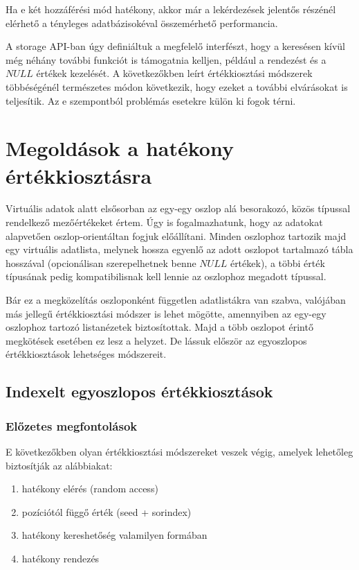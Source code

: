 \documentclass[
    parspace,
    noindent,
    nohyp,
]{elteiktdk}[2023/04/10]
\begin{document}
Ha e két hozzáférési mód hatékony, akkor már a lekérdezések jelentős részénél
elérhető a tényleges adatbázisokéval összemérhető performancia.

A storage API-ban úgy definiáltuk a megfelelő interfészt,
hogy a keresésen kívül még néhány további funkciót is támogatnia kelljen,
például a rendezést és a $NULL$ értékek kezelését.
A következőkben leírt értékkiosztási módszerek többéségénél természetes módon következik,
hogy ezeket a további elvárásokat is teljesítik.
Az e szempontból problémás esetekre külön ki fogok térni.


\section{Megoldások a hatékony értékkiosztásra}

Virtuális adatok alatt elsősorban az egy-egy oszlop alá besorakozó,
közös típussal rendelkező mezőértékeket értem.
Úgy is fogalmazhatunk, hogy az adatokat alapvetően oszlop-orientáltan fogjuk előállítani.
Minden oszlophoz tartozik majd egy virtuális adatlista,
melynek hossza egyenlő az adott oszlopot tartalmazó tábla hosszával
(opcionálisan szerepelhetnek benne $NULL$ értékek),
a többi érték típusának pedig kompatibilisnak kell lennie az oszlophoz megadott típussal.

Bár ez a megközelítás oszloponként független adatlistákra van szabva,
valójában más jellegű értékkiosztási módszer is lehet mögötte,
amennyiben az egy-egy oszlophoz tartozó listanézetek biztosítottak.
Majd a több oszlopot érintő megkötések esetében ez lesz a helyzet.
De lássuk először az egyoszlopos értékkiosztások lehetséges módszereit.

\subsection{Indexelt egyoszlopos értékkiosztások}

\subsubsection{Előzetes megfontolások}

E következőkben olyan értékkiosztási módszereket veszek végig,
amelyek lehetőleg biztosítják az alábbiakat:

\begin{enumerate}
  \item hatékony elérés (random access)
  \item pozíciótól függő érték (seed + sorindex)
  \item hatékony kereshetőség valamilyen formában
  \item hatékony rendezés
\end{enumerate}
\end{document}
